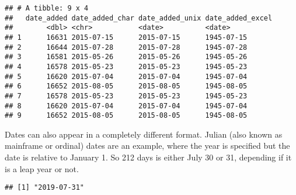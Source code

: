 \documentclass[
]{book}
\newenvironment{Shaded}{\begin{snugshade}}{\end{snugshade}}
\newcommand{\DataTypeTok}[1]{\textcolor[rgb]{0.13,0.29,0.53}{#1}}
\newcommand{\KeywordTok}[1]{\textcolor[rgb]{0.13,0.29,0.53}{\textbf{#1}}}
\newcommand{\NormalTok}[1]{#1}
\newcommand{\OperatorTok}[1]{\textcolor[rgb]{0.81,0.36,0.00}{\textbf{#1}}}
\newcommand{\StringTok}[1]{\textcolor[rgb]{0.31,0.60,0.02}{#1}}
\begin{document}
\begin{Shaded}
\end{Shaded}

\begin{verbatim}
## # A tibble: 9 x 4
##   date_added date_added_char date_added_unix date_added_excel
##        <dbl> <chr>           <date>          <date>          
## 1      16631 2015-07-15      2015-07-15      1945-07-15      
## 2      16644 2015-07-28      2015-07-28      1945-07-28      
## 3      16581 2015-05-26      2015-05-26      1945-05-26      
## 4      16578 2015-05-23      2015-05-23      1945-05-23      
## 5      16620 2015-07-04      2015-07-04      1945-07-04      
## 6      16652 2015-08-05      2015-08-05      1945-08-05      
## 7      16578 2015-05-23      2015-05-23      1945-05-23      
## 8      16620 2015-07-04      2015-07-04      1945-07-04      
## 9      16652 2015-08-05      2015-08-05      1945-08-05
\end{verbatim}

Dates can also appear in a completely different format. Julian (also known as mainframe or ordinal) dates are an example, where the year is specified but the date is relative to January 1. So 212 days is either July 30 or 31, depending if it is a leap year or not.

\begin{Shaded}
\end{Shaded}

\begin{verbatim}
## [1] "2019-07-31"
\end{verbatim}

\begin{Shaded}
\end{Shaded}
\end{document}
